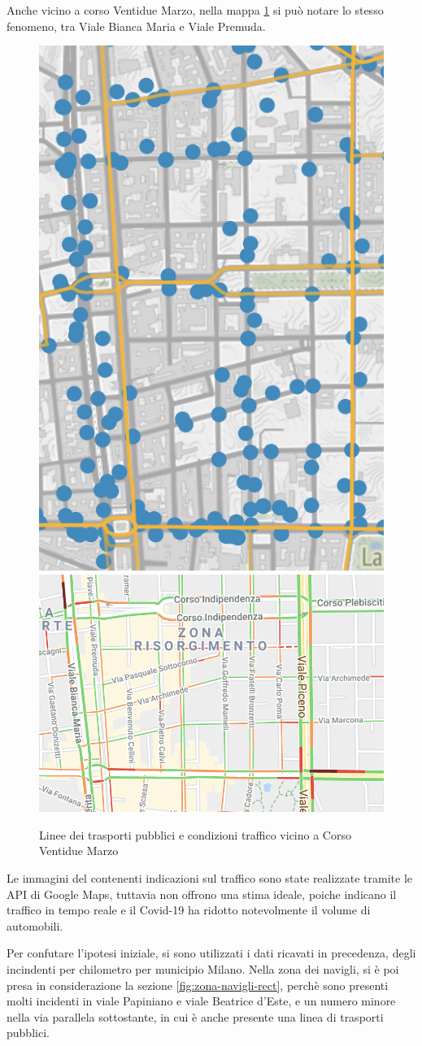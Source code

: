 \documentclass[a4paper]{report}
\begin{document}
Anche vicino a corso Ventidue Marzo, nella mappa \ref{fig:22-marzo} si può 
notare lo stesso fenomeno, tra Viale Bianca Maria e Viale Premuda.

\begin{figure}
    \includegraphics[width=0.25\linewidth]{../src/atm/22_marzo.png}
    \includegraphics[width=0.55\linewidth]{../src/codice_per_dati/googleMaps/22_marzo.png}
    \caption{Linee dei trasporti pubblici e condizioni traffico vicino a Corso Ventidue Marzo}
    \label{fig:22-marzo}
\end{figure}

Le immagini del contenenti indicazioni sul traffico sono state realizzate tramite le API di 
Google Maps, tuttavia non offrono una stima ideale, poiche indicano il traffico in tempo reale e 
il Covid-19 ha ridotto notevolmente il volume di automobili.

Per confutare l'ipotesi iniziale, si sono utilizzati i dati ricavati in precedenza, 
degli incindenti per chilometro per municipio Milano. 
Nella zona dei navigli, si è poi presa in considerazione la sezione \ref{fig:zona-navigli-rect}, 
perchè sono presenti molti incidenti in viale Papiniano e viale Beatrice d'Este, 
e un numero minore nella via parallela sottostante, in cui è anche presente 
una linea di trasporti pubblici.
\end{document}

